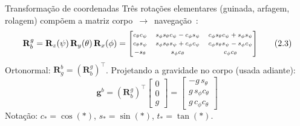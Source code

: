 \documentclass[aspectratio=169,11pt]{beamer}
\begin{document}
\begin{frame}{Transformação de coordenadas}
  Três rotações elementares (guinada, arfagem, rolagem) compõem a matriz corpo~$\to$~navegação~\cite{Farrell2008}:
  \begin{equation}
    \mathbf{R}^{g}_{b} = \mathbf{R}_z(\psi)\,\mathbf{R}_y(\theta)\,\mathbf{R}_x(\phi)
    = {\scriptsize\begin{bmatrix}
      c_\theta c_\psi & s_\phi s_\theta c_\psi - c_\phi s_\psi & c_\phi s_\theta c_\psi + s_\phi s_\psi \\[2pt]
      c_\theta s_\psi & s_\phi s_\theta s_\psi + c_\phi c_\psi & c_\phi s_\theta s_\psi - s_\phi c_\psi \\[2pt]
      -s_\theta & s_\phi c_\theta & c_\phi c_\theta
    \end{bmatrix}} \tag{2.3}
  \end{equation}
  Ortonormal: $\mathbf{R}^{b}_{g} = (\mathbf{R}^{g}_{b})^{\top}$. Projetando a gravidade no corpo (usada adiante):
  \begin{equation}
    \mathbf{g}^{b} = (\mathbf{R}^{g}_{b})^{\top}\!\begin{bmatrix}0\\0\\g\end{bmatrix}
    = \begin{bmatrix} -g\,s_\theta \\ g\,s_\phi c_\theta \\ g\,c_\phi c_\theta \end{bmatrix} \tag{2.5}
  \end{equation}
  \vfill
  {\footnotesize Notação: $c_\ast=\cos(\ast)$, $s_\ast=\sin(\ast)$, $t_\ast=\tan(\ast)$.}
\end{frame}
\end{document}
